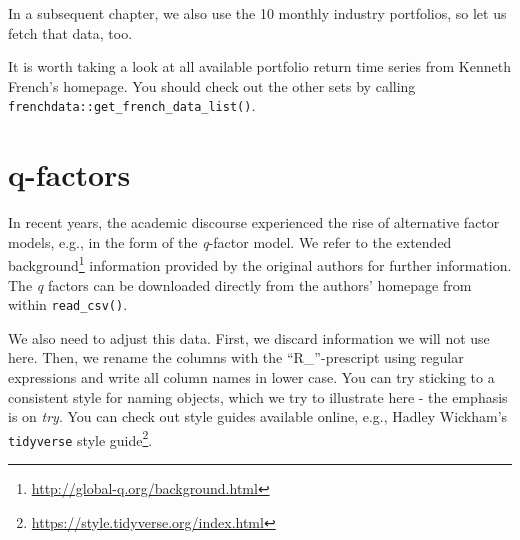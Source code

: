 \documentclass[
]{book}
\newenvironment{Shaded}{\begin{snugshade}}{\end{snugshade}}
\newcommand{\AttributeTok}[1]{\textcolor[rgb]{0.61,0.61,0.61}{#1}}
\newcommand{\DecValTok}[1]{\textcolor[rgb]{0.06,0.06,0.06}{#1}}
\newcommand{\ErrorTok}[1]{\textcolor[rgb]{0.14,0.14,0.14}{\textbf{#1}}}
\newcommand{\FunctionTok}[1]{\textcolor[rgb]{0,0,0}{#1}}
\newcommand{\NormalTok}[1]{#1}
\newcommand{\OtherTok}[1]{\textcolor[rgb]{0.37,0.37,0.37}{#1}}
\newcommand{\SpecialCharTok}[1]{\textcolor[rgb]{0,0,0}{#1}}
\newcommand{\StringTok}[1]{\textcolor[rgb]{0.5,0.5,0.5}{#1}}
\renewcommand{\href}[2]{#2\footnote{\url{#1}}}
\begin{document}
In a subsequent chapter, we also use the 10 monthly industry portfolios, so let us fetch that data, too.

\begin{Shaded}
\end{Shaded}

It is worth taking a look at all available portfolio return time series from Kenneth French's homepage. You should check out the other sets by calling \texttt{frenchdata::get\_french\_data\_list()}.

\hypertarget{q-factors}{%
\section{q-factors}\label{q-factors}}

In recent years, the academic discourse experienced the rise of alternative factor models, e.g., in the form of the \citet{Hou2015} \emph{q}-factor model. We refer to the \href{http://global-q.org/background.html}{extended background} information provided by the original authors for further information. The \emph{q} factors can be downloaded directly from the authors' homepage from within \texttt{read\_csv()}.

We also need to adjust this data. First, we discard information we will not use here. Then, we rename the columns with the ``R\_''-prescript using regular expressions and write all column names in lower case. You can try sticking to a consistent style for naming objects, which we try to illustrate here - the emphasis is on \emph{try}. You can check out style guides available online, e.g., \href{https://style.tidyverse.org/index.html}{Hadley Wickham's \texttt{tidyverse} style guide}.
\end{document}
